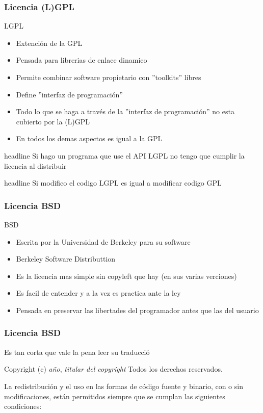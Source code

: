 \documentclass[11pt]{beamer}
\newcommand{\question}[1]
{
\begin{beamercolorbox}[sep=1mm, rounded=true, shadow=true]{headline}
#1
\end{beamercolorbox}
}
\begin{document}
\begin{frame}
\frametitle{Licencia (L)GPL}

\begin{block}{LGPL}

\begin{itemize}[<+-| alert@+>]
\item Extención de la GPL
\item Pensada para librerias de enlace dinamico
\item Permite \alert{combinar} software propietario con ''toolkits'' libres
\item Define ''interfaz de programación''
\item Todo lo que se haga a través de la ''interfaz de programación'' no esta cubierto por la (L)GPL
\item En todos los demas aspectos es igual a la GPL
\end{itemize}

\end{block}
\pause
\question{Si hago un programa que \alert{use} el API LGPL no tengo que cumplir la licencia al distribuir}
\pause
\question{Si \alert{modifico} el codigo LGPL es igual a modificar codigo GPL}

\end{frame}

\begin{frame}
\frametitle{Licencia BSD}
\begin{block}{BSD}
\begin{itemize}[<+-| alert@+>]
\item Escrita por la Universidad de Berkeley para su software
\item Berkeley Software Distributtion
\item Es la licencia mas simple sin copyleft que hay (en sus varias verciones)
\item Es facil de entender y a la vez es practica ante la ley
\item Pensada en preservar las libertades del programador antes que las del usuario
\end{itemize}
\end{block}
\end{frame}


\begin{frame}[fragile]
\frametitle{Licencia BSD}
Es tan corta que vale la pena leer su traducció

\begin{block}

Copyright (c) \emph{año}, \emph{titular del copyright}
Todos los derechos reservados.


La redistribución y el uso en las formas de código fuente y binario, con o sin
modificaciones, están permitidos siempre que se cumplan las siguientes condiciones:
\end{block}
\end{frame}
\end{document}
